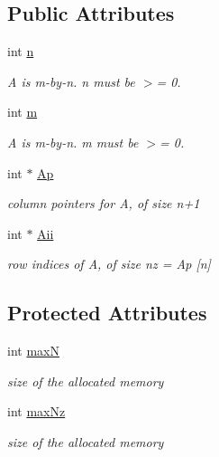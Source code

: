\subsection*{Public Attributes}
\begin{DoxyCompactItemize}
\item 
int \mbox{\hyperlink{classg2o_1_1_matrix_structure_aa91f296406c17ab3a826d03bf75cfea7}{n}}
\begin{DoxyCompactList}\small\item\em A is m-\/by-\/n. n must be $>$= 0. \end{DoxyCompactList}\item 
int \mbox{\hyperlink{classg2o_1_1_matrix_structure_a9cceed2097dcbaa27ed88b7005440616}{m}}
\begin{DoxyCompactList}\small\item\em A is m-\/by-\/n. m must be $>$= 0. \end{DoxyCompactList}\item 
int $\ast$ \mbox{\hyperlink{classg2o_1_1_matrix_structure_aeeff8e78fb766a433aecbfda4a2e3ffc}{Ap}}
\begin{DoxyCompactList}\small\item\em column pointers for A, of size n+1 \end{DoxyCompactList}\item 
int $\ast$ \mbox{\hyperlink{classg2o_1_1_matrix_structure_a7984bf429b8694070ab8db5f5852d8bb}{Aii}}
\begin{DoxyCompactList}\small\item\em row indices of A, of size nz = Ap \mbox{[}n\mbox{]} \end{DoxyCompactList}\end{DoxyCompactItemize}
\subsection*{Protected Attributes}
\begin{DoxyCompactItemize}
\item 
int \mbox{\hyperlink{classg2o_1_1_matrix_structure_a098e58ed3d37bf957307a64f7dc55f32}{maxN}}
\begin{DoxyCompactList}\small\item\em size of the allocated memory \end{DoxyCompactList}\item 
int \mbox{\hyperlink{classg2o_1_1_matrix_structure_a049708086bd4123721351d0580ce5ba1}{max\+Nz}}
\begin{DoxyCompactList}\small\item\em size of the allocated memory \end{DoxyCompactList}\end{DoxyCompactItemize}


